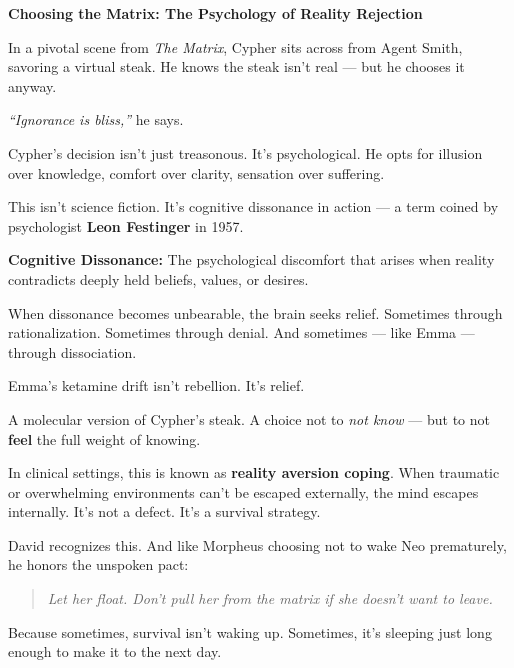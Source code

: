 \begin{PsychologicalSidebar}{\textbf{Choosing the Matrix: The Psychology of Reality Rejection}}

    In a pivotal scene from \textit{The Matrix}, Cypher sits across from Agent Smith, savoring 
    a virtual steak.  
    He knows the steak isn’t real — but he chooses it anyway.

    \medskip
    
    \textit{“Ignorance is bliss,”} he says.

    \medskip
    
    
    Cypher’s decision isn’t just treasonous. It’s psychological.  
    He opts for illusion over knowledge, comfort over clarity, sensation over suffering.

    \medskip
    
    
    This isn’t science fiction.  
    It’s cognitive dissonance in action — a term coined by psychologist \textbf{Leon Festinger} in 1957.
    
    \medskip
    
    \textbf{Cognitive Dissonance:}  
    The psychological discomfort that arises when reality contradicts deeply held beliefs, values, 
    or desires.
    
    \medskip
    
    When dissonance becomes unbearable, the brain seeks relief.  
    Sometimes through rationalization.  
    Sometimes through denial.  
    And sometimes — like Emma — through dissociation.
    
    \medskip
    
    Emma’s ketamine drift isn’t rebellion.  
    It’s relief.

    \medskip
    
    
    A molecular version of Cypher’s steak.  
    A choice not to \textit{not know} — but to not \textbf{feel} the full weight of knowing.
    
    \medskip
    
    In clinical settings, this is known as \textbf{reality aversion coping}.  
    When traumatic or overwhelming environments can’t be escaped externally, the mind 
    escapes internally.  
    It’s not a defect. It’s a survival strategy.
    
    \medskip
    
    David recognizes this.  
    And like Morpheus choosing not to wake Neo prematurely,  
    he honors the unspoken pact:  
    
    \begin{quote}
    \textit{Let her float.  
    Don’t pull her from the matrix  
    if she doesn’t want to leave.}
    \end{quote}
    
    Because sometimes, survival isn't waking up.  
    Sometimes, it’s sleeping just long enough  
    to make it to the next day.
\end{PsychologicalSidebar}
